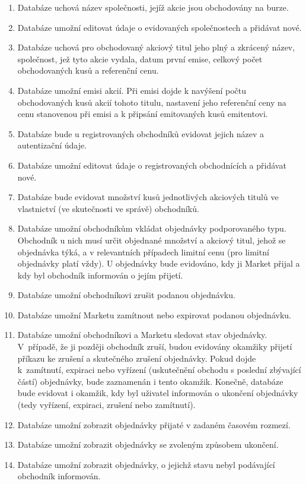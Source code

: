 \documentclass[thesis=M,czech]{FITthesis}[2012/06/26]
\begin{document}
\begin{enumerate}
	\item Databáze uchová název společnosti, jejíž akcie jsou obchodovány na burze.
	\item Databáze umožní editovat údaje o evidovaných společnostech a přidávat nové.
	\item Databáze uchová pro obchodovaný akciový titul jeho plný a zkrácený název, společnost, jež tyto akcie vydala,
		datum první emise, celkový počet obchodovaných kusů a referenční cenu.
	\item Databáze umožní emisi akcií. Při emisi dojde k navýšení počtu obchodovaných kusů akcií tohoto titulu, 
		nastavení jeho referenční ceny na cenu stanovenou při emisi a k připsání emitovaných kusů emitentovi. 
	\item Databáze bude u registrovaných obchodníků evidovat jejich název a autentizační údaje.
	\item Databáze umožní editovat údaje o registrovaných obchodnících a přidávat nové.
	\item Databáze bude evidovat množství kusů jednotlivých akciových titulů ve vlastnictví (ve skutečnosti ve správě) obchodníků.
	\item Databáze umožní obchodníkům vkládat objednávky podporovaného typu. Obchodník u nich musí určit objednané množství 
		a akciový titul, jehož se objednávka týká, a v relevantních případech limitní cenu (pro limitní objednávky platí vždy). 
		U objednávky bude evidováno, kdy ji Market přijal a kdy byl obchodník informován o jejím přijetí. 
	\item Databáze umožní obchodníkovi zrušit podanou objednávku. 
	\item Databáze umožní Marketu zamítnout nebo expirovat podanou objednávku. 
	\item Databáze umožní obchodníkovi a Marketu sledovat stav objednávky. V~případě, že ji později obchodník zruší, 
		budou evidovány okamžiky přijetí příkazu ke zrušení a skutečného zrušení objednávky. Pokud dojde k~zamítnutí, 
		expiraci nebo vyřízení (uskutečnění obchodu s poslední zbývající částí) objednávky, bude zaznamenán i tento okamžik.
		Konečně, databáze bude evidovat i okamžik, kdy byl uživatel informován o ukončení objednávky (tedy
		vyřízení, expiraci, zrušení nebo zamítnutí).
	\item Databáze umožní zobrazit objednávky přijaté v zadaném časovém rozmezí.
	\item Databáze umožní zobrazit objednávky se zvoleným způsobem ukončení.
	\item Databáze umožní zobrazit objednávky, o jejichž stavu nebyl podávající obchodník informován.

\end{enumerate}
\end{document}
